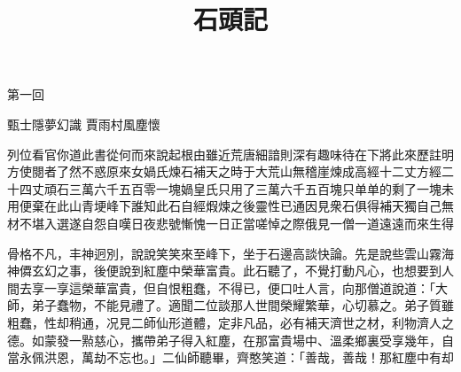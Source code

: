 \documentclass[HongLouMengJiaXuBen]{ltc-guji-digital}
\title{石頭記}
\begin{document}
\begin{正文}
第一回

\begin{段落}[indent=2]
甄士隱夢幻識 賈雨村風塵懷
\end{段落}


列位看官你道此書從何而來說起根由雖近荒唐細諳則深有趣味待在下將此來歷註明方使閱者了然不惑原來女媧氏煉石補天之時于大荒山無稽崖煉成高經十二丈方經二十四丈頑石三萬六千五百零一塊媧皇氏只用了三萬六千五百塊只单单的剩了一塊未用便棄在此山青埂峰下誰知此石自經煆煉之後靈性已通因見衆石俱得補天獨自己無材不堪入選遂自怨自嘆日夜悲號慚愧一日正當嗟悼之際俄見一僧一道遠遠而來生得

骨格不凡，丰神迥別，說說笑笑來至峰下，坐于石邊高談快論。先是說些雲山霧海神僲玄幻之事，後便說到紅塵中榮華富貴。此石聽了，不覺打動凡心，也想要到人間去享一享這榮華富貴，但自恨粗蠢，不得已，便口吐人言，向那僧道說道：「大師，弟子蠢物，不能見禮了。適聞二位談那人世間榮耀繁華，心切慕之。弟子質雖粗蠢，性却稍通，况見二師仙形道體，定非凡品，必有補天濟世之材，利物濟人之德。如蒙發一㸃慈心，攜帶弟子得入紅塵，在那富貴場中、溫柔鄉裏受享幾年，自當永佩洪恩，萬劫不忘也。」二仙師聽畢，齊憨笑道：「善哉，善哉！那紅塵中有却

\end{正文}
\end{document}
